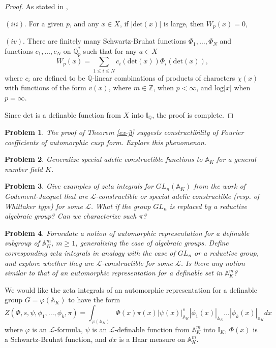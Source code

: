 \documentclass[12pt]{amsart}
\def\A{\mathbb{A}}
\def\I{\mathbb{I}}
\def\Z{\mathbb{Z}}
\def\cL{\mathcal{L}}
\def\Q{\mathbb{Q}}
\def\cL{\mathcal{L}}
\numberwithin{equation}{section}
\newtheorem{prob}{Problem}[section]
\begin{document}
\begin{proof}
As stated in \cite[page 11]{GS-book},
 
$(iii).$ For a given $p$, and any $x\in X$, if $|\mathrm{det}(x)|$ is large, then $W_p(x)=0$,

$(iv).$ There are finitely many Schwartz-Bruhat functions $\Phi_1,\dots,\Phi_N$ and functions $c_1,\dots,c_N$ on $\Q_p^*$ 
such that for any $a\in X$
$$W_p(x)=\sum_{1\leq i\leq N} c_i(\mathrm{det}(x))\Phi_i(\mathrm{det}(x)),$$
where $c_i$ are defined to be $\Q$-linear combinations of products of characters $\chi(x)$ with functions of the form 
$v(x)$, where $m\in \Z$, when $p<\infty$, and $\mathrm{log}|x|$ when $p=\infty$.

Since $\mathrm{det}$ is a definable function from $X$ into $\I_{\Q}$, the proof is complete.
\end{proof}

\begin{prob} The proof of Theorem \ref{ex-jl} suggests constructibility of Fourier coefficients of automorphic cusp form. 
Explore this phenomenon.\end{prob}

\begin{prob} Generalize special adelic constructible functions to $\A_K$ for a general number field $K$.\end{prob}

\begin{prob}\label{zeta-ex} Give examples of zeta integrals for $GL_n(\A_K)$ from the work of Godement-Jacquet \cite{jaq-good} that are $\cL$-constructible or special adelic constructible (resp. of Whittaker type) for some $\cL$. What if the group $GL_n$ is replaced by a reductive algebraic group? Can we characterize such $\pi$?\end{prob}

\begin{prob}\label{def-aut} Formulate a notion of automorphic representation for a definable subgroup of $\A_K^m$, $m\geq 1$, generalizing the case of algebraic groups. Define corresponding zeta integrals in analogy with the case of $GL_n$ or 
a reductive group, and explore whether they are $\cL$-constructible for some $\cL$. Is there any notion similar to that of an automorphic representation for a definable set in $\A_K^m$?
\end{prob}
We would like the zeta integrals of an automorphic representation for a definable group $G=\varphi(\A_K)$ to have the form
$$Z(\Phi,s,\psi,\phi_1,\dots,\phi_k,\pi)=
\int_{\varphi(\A_K)} \Phi(x) \pi(x) |\psi(x)|_{\A_K}^s|\phi_1(x)|_{\A_K}\dots |\phi_k(x)|_{\A_K} dx$$
where $\varphi$ is an $\cL$-formula, $\psi$ is an $\cL$-definable function from $\A_K^m$ into 
$\I_K$, $\Phi(x)$ is a Schwartz-Bruhat function, and $dx$ is a Haar measure on $\A_K^m$. 
\end{document}
